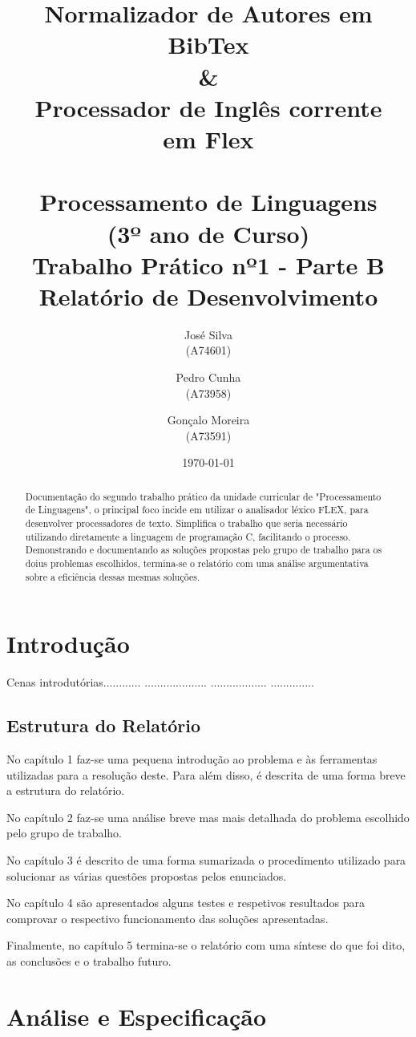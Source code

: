 \documentclass{report}
\title{ \textbf{Normalizador de Autores em BibTex}\\ 
\textbf{\&} \\
\textbf{Processador de Inglês corrente} \\ 
\textbf{em Flex} \\ \textbf{} \\
Processamento de Linguagens\\(3º ano de Curso)\\ 
\textbf{Trabalho Prático nº1 - Parte B}\\ Relatório de Desenvolvimento}
\author{José Silva\\ (A74601) \and Pedro Cunha\\ (A73958) \and Gonçalo Moreira\\ (A73591) }
\date{\today}
\begin{document}
\maketitle

\begin{abstract}
Documentação do segundo trabalho prático da unidade curricular de "Processamento de Linguagens", o principal foco incide em utilizar o analisador léxico FLEX, para desenvolver processadores de texto. 
Simplifica o trabalho que seria necessário utilizando diretamente a linguagem de programação C, facilitando o processo. 
Demonstrando e documentando as soluções propostas pelo grupo de trabalho para os doius problemas escolhidos, termina-se o relatório com uma análise argumentativa sobre a eficiência dessas mesmas soluções. 
\end{abstract}

\tableofcontents


\chapter{Introdução} \label{intro}

Cenas introdutórias............
....................
..................
..............


\section*{Estrutura do Relatório}
No capítulo 1 faz-se uma pequena introdução ao problema e às ferramentas utilizadas para a resolução deste. Para além disso, é descrita de uma forma breve a estrutura do relatório.\par
No capítulo 2 faz-se uma análise breve mas mais detalhada do problema escolhido pelo grupo de trabalho.\par
No capítulo 3 é descrito de uma forma sumarizada o procedimento utilizado para solucionar as várias questões propostas pelos enunciados.\par
No capítulo 4 são apresentados alguns testes e respetivos resultados para comprovar o respectivo funcionamento das soluções apresentadas.\par
Finalmente, no capítulo 5 termina-se o relatório com uma síntese do que foi dito, as conclusões e o trabalho futuro.

\chapter{Análise e Especificação} \label{ae}
\end{document}
